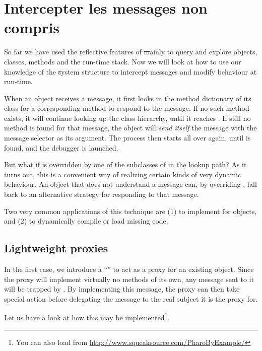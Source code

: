 \documentclass[a4paper,10pt,twoside]{book}
\begin{document}
\section{Intercepter les messages non compris}

So far we have used the reflective features of \st mainly to query and explore objects, classes, methods and the run-time stack. Now we will look at how to use our knowledge of the \st system structure to intercept messages and modify behaviour at run-time.

When an object receives a message, it first looks in the method dictionary of its class for a corresponding method to respond to the message.
If no such method exists, it will continue looking up the class hierarchy, until it reaches . If still no method is found for that message, the object will \emph{send itself} the message  with the message selector as its argument.
The process then starts all over again, until  is found, and the debugger is launched.

But what if  is overridden by one of the subclasses of  in the lookup path?
As it turns out, this is a convenient way of realizing certain kinds of very dynamic behaviour. An object that does not understand a message can, by overriding , fall back to an alternative strategy for responding to that message.

Two very common applications of this technique are (1) to implement  for objects, and (2) to dynamically compile or load missing code.

\subsection{Lightweight proxies}

In the first case, we introduce a ``'' to act as a proxy for an existing object.
Since the proxy will implement virtually no methods of its own, any message sent to it will be trapped by . By implementing this message, the proxy can then take special action before delegating the message to the real subject it is the proxy for.

Let us have a look at how this may be implemented\footnote{You can also load  from \url{http://www.squeaksource.com/PharoByExample/}}.
\end{document}
